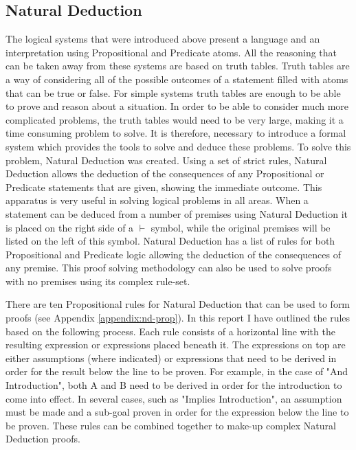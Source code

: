 \subsection{Natural Deduction}

The logical systems that were introduced above present a language and an interpretation using Propositional and Predicate atoms. All the reasoning that can be taken away from these systems are based on truth tables. Truth tables are a way of considering all of the possible outcomes of a statement filled with atoms that can be true or false. For simple systems truth tables are enough to be able to prove and reason about a situation. In order to be able to consider much more complicated problems, the truth tables would need to be very large, making it a time consuming problem to solve. It is therefore, necessary to introduce a formal system which provides the tools to solve and deduce these problems. To solve this problem, Natural Deduction was created. Using a set of strict rules, Natural Deduction allows the deduction of the consequences of any Propositional or Predicate statements that are given, showing the immediate outcome. This apparatus is very useful in solving logical problems in all areas. When a statement can be deduced from a number of premises using Natural Deduction it is placed on the right side of a $\vdash$ symbol, while the original premises will be listed on the left of this symbol. Natural Deduction has a list of rules for both Propositional and Predicate logic allowing the deduction of the consequences of any premise. This proof solving methodology can also be used to solve proofs with no premises using its complex rule-set.

There are ten Propositional rules for Natural Deduction that can be used to form proofs (see Appendix \ref{appendix:nd-prop}). In this report I have outlined the rules based on the following process. Each rule consists of a horizontal line with the resulting expression or expressions placed beneath it. The expressions on top are either assumptions (where indicated) or expressions that need to be derived in order for the result below the line to be proven. For example, in the case of "And Introduction", both A and B need to be derived in order for the introduction to come into effect. In several cases, such as "Implies Introduction", an assumption must be made and a sub-goal proven in order for the expression below the line to be proven. These rules can be combined together to make-up complex Natural Deduction proofs.

